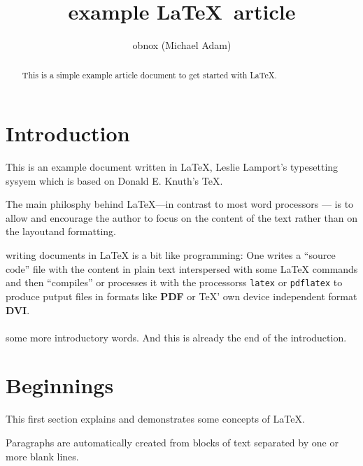 \documentclass{article}
\title{example \LaTeX\ article}
\author{obnox (Michael Adam)}
\begin{document}
\maketitle

\begin{abstract}

    This is a simple  example article document to get started with  {\LaTeX}.

\end{abstract}

\tableofcontents

\section*{Introduction}

This is an example document written in {\LaTeX}, Leslie Lamport's typesetting
sysyem which is based on Donald E. Knuth's {\TeX}.

The main philosphy behind {\LaTeX}---in contrast to most word processors --- is to allow and encourage the author to
focus on the content of the text rather than on the layoutand formatting.

writing documents in {\LaTeX} is a bit like programming: One writes a ``source code''  file with the content in plain text
interspersed with some {\LaTeX} commands
and then ``compiles'' or processes it with the processorss \verb|latex| or \verb|pdflatex| to produce
putput files in formats like \textbf{PDF} or {\TeX}' own device independent format \textbf{DVI}.


\paragraph{}some more introductory words.
And this is already the end of the introduction.




\section{Beginnings}
\label{sec:beginnings}

This first section explains and demonstrates some concepts of {\LaTeX}.

Paragraphs are automatically created from blocks of text separated by one or more
blank lines.
\end{document}

